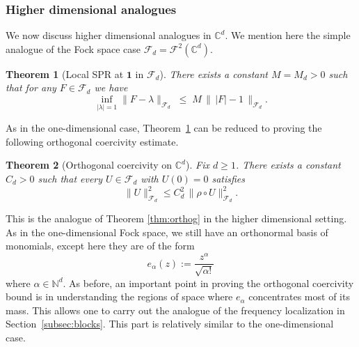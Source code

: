 \documentclass[11pt]{amsart}
\newtheorem{theorem}{Theorem}[section]
\theoremstyle{remark}
\newcommand{\C}{\mathbb{C}}
\newcommand{\abs}[1]{\lvert #1 \rvert}
\newcommand{\norm}[1]{\lVert #1 \rVert}
\newcommand{\dd}{\mathrm{d}}
\newcommand{\ee}{\mathrm{e}}
\newcommand{\rhoFn}{\rho}
\newcommand{\Fd}{\mathcal{F}_d}
\begin{document}
\subsubsection{Higher dimensional analogues} We now discuss higher dimensional analogues in $\mathbb{C}^d$. We mention here the simple analogue of the Fock space case $\Fd = \mathcal{F}^2(\C^d)$. 


\begin{theorem}[Local SPR at $\mathbf{1}$ in $\mathcal{F}_d$]\label{mainhigherd:local}
There exists a constant $M=M_d> 0$ such
that for any $F\in \mathcal{F}_d$ we have
\[
\inf_{|\lambda|=1}\lVert F - \lambda \rVert_{\mathcal{F}_d}
\;\le\;
M\,
\bigl\|\, \lvert F \rvert - 1 \,\bigr\|_{\mathcal{F}_d}.
\]
\end{theorem}
As in the one-dimensional case, Theorem~\ref{mainhigherd:local} can be reduced to proving the following orthogonal coercivity estimate.
\begin{theorem}[Orthogonal coercivity on $\C^d$]\label{thm:orthogd}
Fix $d \ge 1$.  There exists a constant $C_d > 0$ such that every
$U \in \Fd$ with $U(0) = 0$ satisfies
\[
\norm{U}_{\Fd}^2
\le
C_d^2\, \norm{\rhoFn \circ U}_{\Fd}^2.
\]
\end{theorem}
This is the analogue of Theorem \ref{thm:orthog} in the higher dimensional setting. As in the one-dimensional Fock space, we still have an orthonormal basis of monomials, except here they are of the form
\[
e_\alpha(z) := \frac{z^\alpha}{\sqrt{\alpha!}}
\]
where $\alpha\in\mathbb{N}^d$. As before, an important point in proving the orthogonal coercivity bound is in understanding the regions of space where $e_{\alpha}$ concentrates most of its mass. This allows one to carry out the analogue of the frequency localization in Section~\ref{subsec:blocks}. This part is relatively similar to the one-dimensional case. %
\vspace{0.5em}
\end{document}
